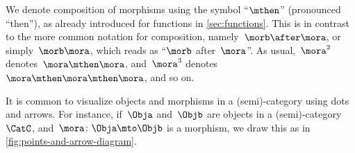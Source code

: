 \begin{remark}
	We denote composition of morphisms using the symbol ``$\mthen$'' (pronounced ``then''), as already introduced for functions in \cref{sec:functions}.
	This is in contrast to the more common notation for composition, namely~$\morb\after \mora$, or simply~$\morb \mora$, which reads as ``$\morb$ after~$\mora$''.
	As usual,~$\mora^2$ denotes~$\mora \mthen \mora$, and~$\mora^3$ denotes~$\mora \mthen \mora \mthen \mora$, and so on.
\end{remark}

\begin{marginfigure}
	\begin{center}
	\end{center}
	\caption{}
	\label{fig:points-and-arrow-diagram}
\end{marginfigure}

It is common to visualize objects and morphisms in a (semi)-category using dots and arrows.
For instance, if~$\Obja$ and~$\Objb$ are objects in a (semi)-category~$\CatC$, and~$\mora\colon \Obja \mto \Objb$ is a morphism, we draw this as in \cref{fig:points-and-arrow-diagram}.


